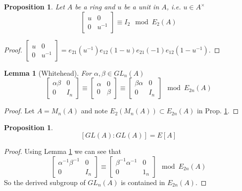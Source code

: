 \documentclass[12pt]{article}
\numberwithin{equation}{section}
\newcounter{dummy} \numberwithin{dummy}{section}
\newtheorem{lemma}[dummy]{Lemma}
\newtheorem{proposition}[dummy]{Proposition}
\begin{document}
	\begin{proposition}\label{whiteheadsimple}
		Let $A$ be a ring and $u$ be a unit in $A$, i.e. $u \in A^\times$
		\[ {\displaystyle {\begin{bmatrix}u&0\\0&u^{-1}\end{bmatrix}}} \equiv I_2 \mod E_2(A)\]
	\end{proposition}
	\begin{proof}
		${\displaystyle {\begin{bmatrix}u&0\\0&u^{-1}\end{bmatrix}}=e_{21}(u^{-1})e_{12}(1-u)e_{21}(-1)e_{12}(1-u^{-1}).}$
	\end{proof}
	\begin{lemma}[Whitehead]\label{whiteheadmain}
		For $\alpha,\beta \in GL_n(A)$ \[ \begin{bmatrix}
			\alpha \beta & 0 \\ 0 & I_n
		\end{bmatrix} \equiv \begin{bmatrix} \alpha & 0 \\ 0 & \beta
		\end{bmatrix} \equiv \begin{bmatrix}
			\beta \alpha  & 0 \\ 0 & I_n 
		\end{bmatrix} \mod E_{2n} (A)\]
	\end{lemma}
	\begin{proof}
		Let $A=M_n(A)$ and note $E_2(M_n(A) ) \subset E_{2n}(A)$ in Prop. \ref{whiteheadsimple}.
	\end{proof}
		\begin{proposition}
		\[ [GL(A):GL(A)]=E[A] \]
	\end{proposition}
	\begin{proof}
		Using Lemma \ref{whiteheadmain} we can see that \[ \begin{bmatrix}
			\alpha^{-1}\beta^{-1} & 0 \\ 0 & I_n
		\end{bmatrix} \equiv \begin{bmatrix}
			\beta^{-1} \alpha^{-1 } & 0 \\
			0 & 1_n
		\end{bmatrix} \mod E_{2n}(A)\]
		So the derived subgroup of $GL_n(A)$ is contained in $E_{2n}(A)$. 
	\end{proof}	
	
\end{document}
